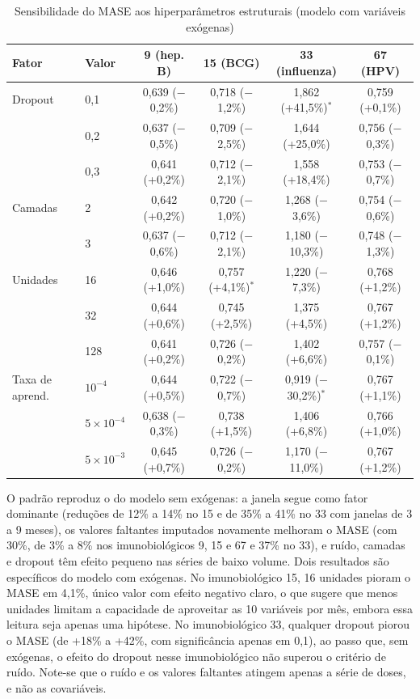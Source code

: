 \documentclass[
    12pt,
    openright,
    oneside,
    a4paper,
    english,
    brazil
]{abntex2}
\begin{document}
\begin{table}[htb]
  \centering
  \caption{Sensibilidade do MASE aos hiperparâmetros estruturais (modelo com variáveis exógenas)}
  \label{tab:sens_estrutural_exo}
  \footnotesize
  \setlength{\tabcolsep}{3pt}
  \begin{tabular}{llcccc}
    \toprule
    \textbf{Fator} & \textbf{Valor} & \textbf{9 (hep. B)} & \textbf{15 (BCG)} & \textbf{33 (influenza)} & \textbf{67 (HPV)} \\
    \midrule
    Dropout & 0,1 & 0,639 ($-$0,2\%) & 0,718 ($-$1,2\%) & 1,862 (+41,5\%)$^{*}$ & 0,759 (+0,1\%) \\
     & 0,2 & 0,637 ($-$0,5\%) & 0,709 ($-$2,5\%) & 1,644 (+25,0\%) & 0,756 ($-$0,3\%) \\
     & 0,3 & 0,641 (+0,2\%) & 0,712 ($-$2,1\%) & 1,558 (+18,4\%) & 0,753 ($-$0,7\%) \\
    \midrule
    Camadas & 2 & 0,642 (+0,2\%) & 0,720 ($-$1,0\%) & 1,268 ($-$3,6\%) & 0,754 ($-$0,6\%) \\
     & 3 & 0,637 ($-$0,6\%) & 0,712 ($-$2,1\%) & 1,180 ($-$10,3\%) & 0,748 ($-$1,3\%) \\
    \midrule
    Unidades & 16 & 0,646 (+1,0\%) & 0,757 (+4,1\%)$^{*}$ & 1,220 ($-$7,3\%) & 0,768 (+1,2\%) \\
     & 32 & 0,644 (+0,6\%) & 0,745 (+2,5\%) & 1,375 (+4,5\%) & 0,767 (+1,2\%) \\
     & 128 & 0,641 (+0,2\%) & 0,726 ($-$0,2\%) & 1,402 (+6,6\%) & 0,757 ($-$0,1\%) \\
    \midrule
    Taxa de aprend. & $10^{-4}$ & 0,644 (+0,5\%) & 0,722 ($-$0,7\%) & 0,919 ($-$30,2\%)$^{*}$ & 0,767 (+1,1\%) \\
     & $5\times10^{-4}$ & 0,638 ($-$0,3\%) & 0,738 (+1,5\%) & 1,406 (+6,8\%) & 0,766 (+1,0\%) \\
     & $5\times10^{-3}$ & 0,645 (+0,7\%) & 0,726 ($-$0,2\%) & 1,170 ($-$11,0\%) & 0,767 (+1,2\%) \\
    \bottomrule
  \end{tabular}
\end{table}

O padrão reproduz o do modelo sem exógenas: a janela segue como fator dominante (reduções de 12\% a 14\% no 15 e de 35\% a 41\% no 33 com janelas de 3 a 9 meses), os valores faltantes imputados novamente melhoram o MASE (com 30\%, de 3\% a 8\% nos imunobiológicos 9, 15 e 67 e 37\% no 33), e ruído, camadas e dropout têm efeito pequeno nas séries de baixo volume. Dois resultados são específicos do modelo com exógenas. No imunobiológico 15, 16 unidades pioram o MASE em 4,1\%, único valor com efeito negativo claro, o que sugere que menos unidades limitam a capacidade de aproveitar as 10 variáveis por mês, embora essa leitura seja apenas uma hipótese. No imunobiológico 33, qualquer dropout piorou o MASE (de +18\% a +42\%, com significância apenas em 0,1), ao passo que, sem exógenas, o efeito do dropout nesse imunobiológico não superou o critério de ruído. Note-se que o ruído e os valores faltantes atingem apenas a série de doses, e não as covariáveis.
\end{document}
